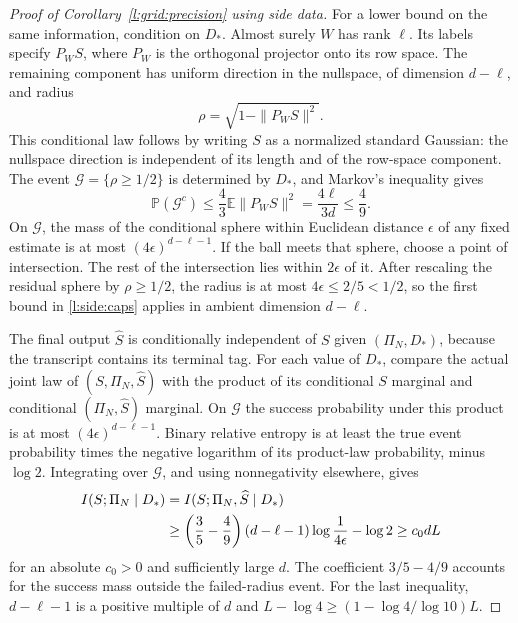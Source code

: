 \begin{proof}[Proof of Corollary~\ref{l:grid:precision} using side data]
For a lower bound on the same information, condition on $D_*$.  Almost
surely $W$ has rank $\ell$.  Its labels specify $P_WS$, where $P_W$ is
the orthogonal projector onto its row space.  The remaining component
has uniform direction in the nullspace, of dimension $d-\ell$, and radius
\[
 \rho=\sqrt{1-\|P_WS\|^2}.
\]
This conditional law follows by writing $S$ as a normalized standard
Gaussian: the nullspace direction is independent of its length and of
the row-space component.  The event $\mathcal G=\{\rho\ge1/2\}$ is
determined by $D_*$, and Markov's inequality gives
\begin{equation}\label{l:side:good-radius}
 \mathbb P(\mathcal G^c)
 \le\frac43\mathbb E\|P_WS\|^2
 =\frac{4\ell}{3d}\le\frac49.
\end{equation}
On $\mathcal G$, the mass of the conditional sphere within Euclidean
distance $\epsilon$ of any fixed estimate is at most
$(4\epsilon)^{d-\ell-1}$.  If the ball meets that sphere, choose a point
of intersection.  The rest of the intersection lies within $2\epsilon$
of it.  After rescaling the residual sphere by $\rho\ge1/2$, the radius
is at most $4\epsilon\le2/5<1/2$, so the first bound in
\eqref{l:side:caps} applies in ambient dimension $d-\ell$.

The final output $\widehat S$ is conditionally independent of $S$ given
$(\Pi_N,D_*)$, because the transcript contains its terminal tag.
For each value of $D_*$, compare the actual joint law of
$(S,\Pi_N,\widehat S)$ with the product of its conditional $S$ marginal
and conditional $(\Pi_N,\widehat S)$ marginal.  On $\mathcal G$ the
success probability under this product is at most
$(4\epsilon)^{d-\ell-1}$.  Binary relative entropy is at least the true
event probability times the negative logarithm of its product-law
probability, minus $\log2$.  Integrating over $\mathcal G$, and using
nonnegativity elsewhere, gives
\begin{align}
 I(S;\Pi_N\mid D_*)
 &=I(S;\Pi_N,\widehat S\mid D_*)\notag\\
 &\ge\left(\frac35-\frac49\right)(d-\ell-1)
       \log\frac1{4\epsilon}-\log2
 \ge c_0dL
 \label{l:side:transcript-lower}
\end{align}
for an absolute $c_0>0$ and sufficiently large $d$.  The coefficient
$3/5-4/9$ accounts for the success mass outside the failed-radius event.
For the last inequality, $d-\ell-1$ is a positive multiple of $d$ and
$L-\log4\ge(1-\log4/\log10)L$.


\end{proof}
